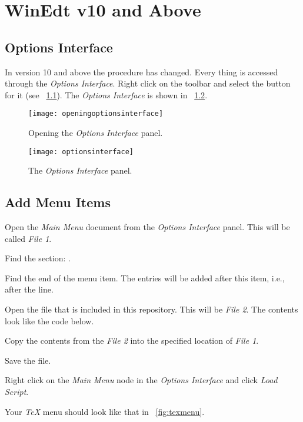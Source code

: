 \chapter{WinEdt v10 and Above}
\section{Options Interface}
In version 10 and above the procedure has changed.  Every thing is accessed through the \textit{Options Interface}.  Right click on the toolbar and select the button for it (see \figurename~\ref{fig:openingoptionsinterface}).  The \textit{Options Interface} is shown in \figurename~\ref{fig:optionsinterface}.
\begin{figure}
	\centering
	\texttt{[image: openingoptionsinterface]}
	\caption[Opening the \textit{Options Interface} panel]{Opening the \textit{Options Interface} panel.}
	\label{fig:openingoptionsinterface}
\end{figure}

\begin{figure}
	\centering
	\texttt{[image: optionsinterface]}
	\caption[The \textit{Options Interface} panel]{The \textit{Options Interface} panel.}
	\label{fig:optionsinterface}
\end{figure}


\section{Add Menu Items}
\label{sec:addmenuitems}
\begin{numberedlist}
	\item Open the \textit{Main Menu} document from the \textit{Options Interface} panel.  This will be called \emph{File 1}.
	\item Find the section: .
	\item Find the end of the  menu item.  The entries will be added after this item, i.e., after the  line.
	\item Open the file  that is included in this repository.  This will be \emph{File 2}.  The contents look like the code below.
	\item Copy the contents from the \emph{File 2} into the specified location of \emph{File 1}.
	\item Save the file.
	\item Right click on the \emph{Main Menu} node in the \emph{Options Interface} and click \emph{Load Script}.
	\item Your \emph{TeX} menu should look like that in \figurename~\ref{fig:texmenu}.
\end{numberedlist}

